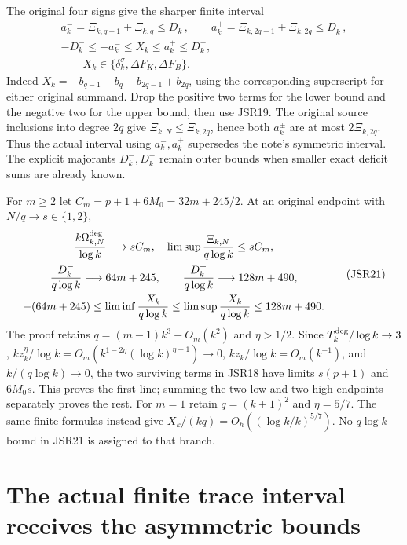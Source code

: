 \documentclass[11pt,a4paper]{article}
\begin{document}
The original four signs give the sharper finite interval
\[
\begin{gathered}
 a_k^-=\Xi_{k,q-1}+\Xi_{k,q}\leq D_k^-,\qquad
 a_k^+=\Xi_{k,2q-1}+\Xi_{k,2q}\leq D_k^+,\\
 -D_k^-\leq-a_k^-\leq X_k\leq a_k^+\leq D_k^+,\\
 \qquad X_k\in\{\delta_k^\sigma,\Delta F_K,\Delta F_B\}.
\end{gathered}\tag{JSR20}
\]
Indeed $X_k=-b_{q-1}-b_q+b_{2q-1}+b_{2q}$, using the
corresponding superscript for either original summand.
Drop the positive two terms for the lower bound and the
negative two for the upper bound, then use JSR19.
The original source inclusions into degree $2q$ give
$\Xi_{k,N}\leq\Xi_{k,2q}$, hence both $a_k^\pm$ are
at most $2\Xi_{k,2q}$. Thus the actual interval using
$a_k^-,a_k^+$ supersedes the note's symmetric interval.
The explicit majorants $D_k^-,D_k^+$ remain outer bounds
when smaller exact deficit sums are already known.

For $m\geq2$ let $C_m=p+1+6M_0=32m+245/2$.
At an original endpoint with $N/q\to s\in\{1,2\}$,
\[
\begin{gathered}
 \frac{k\Omega_{k,N}^{\rm deg}}{\log k}\longrightarrow sC_m,
 \quad\limsup\frac{\Xi_{k,N}}{q\log k}\leq sC_m,\\
 \frac{D_k^-}{q\log k}\longrightarrow64m+245,\qquad
 \frac{D_k^+}{q\log k}\longrightarrow128m+490,\\
 -(64m+245)\leq\liminf\frac{X_k}{q\log k}
 \leq\limsup\frac{X_k}{q\log k}\leq128m+490.
\end{gathered}\tag{JSR21}
\]
The proof retains $q=(m-1)k^3+O_m(k^2)$ and $\eta>1/2$.
Since $T_k^{\rm deg}/\log k\to3$,
$kz_k^\eta/\log k
=O_m(k^{1-2\eta}(\log k)^{\eta-1})\to0$,
$kz_k/\log k=O_m(k^{-1})$, and
$k/(q\log k)\to0$, the two surviving terms in JSR18
have limits $s(p+1)$ and $6M_0s$.
This proves the first line; summing the two low and two
high endpoints separately proves the rest.
For $m=1$ retain $q=(k+1)^2$ and $\eta=5/7$.
The same finite formulas instead give
$X_k/(kq)=O_h((\log k/k)^{5/7})$.
No $q\log k$ bound in JSR21 is assigned to that branch.

\section{The actual finite trace interval receives the asymmetric bounds}
\end{document}
